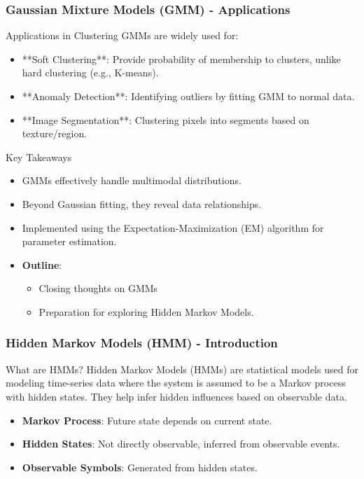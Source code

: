 \documentclass[aspectratio=169]{beamer}
\begin{document}
\begin{frame}[fragile]
    \frametitle{Gaussian Mixture Models (GMM) - Applications}
    \begin{block}{Applications in Clustering}
        GMMs are widely used for:
    \end{block}
    \begin{itemize}
        \item **Soft Clustering**: Provide probability of membership to clusters, unlike hard clustering (e.g., K-means).
        \item **Anomaly Detection**: Identifying outliers by fitting GMM to normal data.
        \item **Image Segmentation**: Clustering pixels into segments based on texture/region.
    \end{itemize}

    \begin{block}{Key Takeaways}
        \begin{itemize}
            \item GMMs effectively handle multimodal distributions.
            \item Beyond Gaussian fitting, they reveal data relationships.
            \item Implemented using the Expectation-Maximization (EM) algorithm for parameter estimation.
        \end{itemize}
    \end{block}

    \begin{itemize}
        \item \textbf{Outline}:
        \begin{itemize}
            \item Closing thoughts on GMMs
            \item Preparation for exploring Hidden Markov Models.
        \end{itemize}
    \end{itemize}
\end{frame}

\begin{frame}[fragile]
    \frametitle{Hidden Markov Models (HMM) - Introduction}
    \begin{block}{What are HMMs?}
        Hidden Markov Models (HMMs) are statistical models used for 
        modeling time-series data where the system is assumed to be a 
        Markov process with hidden states. They help infer hidden 
        influences based on observable data.
    \end{block}
    
    \begin{itemize}
        \item \textbf{Markov Process}: Future state depends on current state.
        \item \textbf{Hidden States}: Not directly observable, inferred from observable events.
        \item \textbf{Observable Symbols}: Generated from hidden states.
    \end{itemize}
\end{frame}
\end{document}
